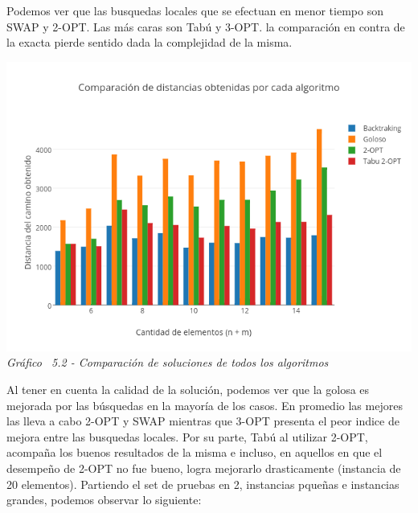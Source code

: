 Podemos ver que las busquedas locales que se efectuan en menor tiempo son SWAP y 2-OPT. Las más caras son Tabú y 3-OPT. la comparación en contra de la exacta pierde sentido dada la complejidad de la misma.


\vspace*{0.3cm} \vspace*{0.3cm}
  \begin{center}
 \includegraphics[scale=0.5]{./EJ5/comparativo.png}\\
 {\textit{Gráfico \ 5.2 - Comparaci\'on de soluciones de todos los algoritmos}}
  \end{center}
  \vspace*{0.3cm}
  
  


Al tener en cuenta la calidad de la solución, podemos ver que la golosa es mejorada por las búsquedas en la mayoría de los casos. En promedio las mejores las lleva a cabo 2-OPT y SWAP mientras que 3-OPT presenta el peor indice de mejora entre las busquedas locales. Por su parte, Tabú al utilizar 2-OPT, acompaña los buenos resultados de la misma e incluso, en aquellos en que el desempeño de 2-OPT no fue bueno, logra mejorarlo drasticamente (instancia de 20 elementos).
Partiendo el set de pruebas en 2, instancias pqueñas e instancias grandes, podemos observar lo siguiente:

